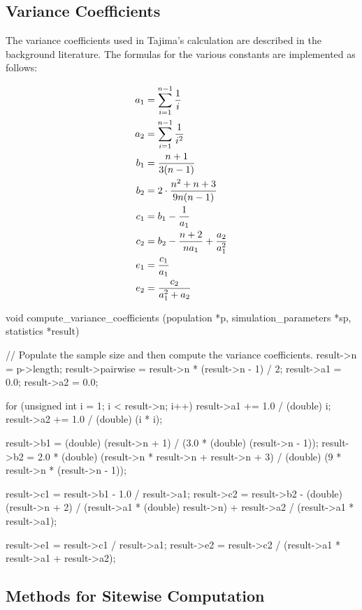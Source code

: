 \documentclass{article}
\begin{document}
    \subsection{Variance Coefficients}
      \label{sec:variance-coefficients}

      The variance coefficients used in Tajima's \D{} calculation are described
      in the background literature. The formulas for the various constants are
      implemented as follows:

      \begin{align*}
	a_1 & = \sum_{i=1}^{n-1} {1 \over i} \\ %
	a_2 & = \sum_{i=1}^{n-1} {1 \over i^2} \\ %
	b_1 & = {n + 1 \over 3(n - 1)} \\ %
	b_2 & = 2 \cdot {n^2 + n + 3 \over 9n(n - 1)} \\ %
	c_1 & = b_1 - {1 \over a_1} \\ %
	c_2 & = b_2 - {n + 2 \over na_1} + {a_2 \over a_1^2} \\ %
	e_1 & = {c_1 \over a_1} \\ %
	e_2 & = {c_2 \over a_1^2 + a_2}
      \end{align*}

\begin{ccode}
void compute_variance_coefficients (population *p, simulation_parameters *sp, statistics *result) {
  // Populate the sample size and then compute the variance coefficients.
  result->n 		= p->length;
  result->pairwise	= result->n * (result->n - 1) / 2;
  result->a1		= 0.0;
  result->a2		= 0.0;

  for (unsigned int i = 1; i < result->n; i++) {
    result->a1 += 1.0 / (double) i;
    result->a2 += 1.0 / (double) (i * i);
  }

  result->b1 = (double) (result->n + 1) / (3.0 * (double) (result->n - 1));
  result->b2 = 2.0 * (double) (result->n * result->n + result->n + 3) /
		     (double) (9 * result->n * (result->n - 1));

  result->c1 = result->b1 - 1.0 / result->a1;
  result->c2 = result->b2 -
	       (double) (result->n + 2) / (result->a1 * (double) result->n) +
	       result->a2 / (result->a1 * result->a1);

  result->e1 = result->c1 / result->a1;
  result->e2 = result->c2 / (result->a1 * result->a1 + result->a2);
}
\end{ccode}

    \subsection{Methods for Sitewise Computation}
      \label{sec:sitewise-computation}
\end{document}
